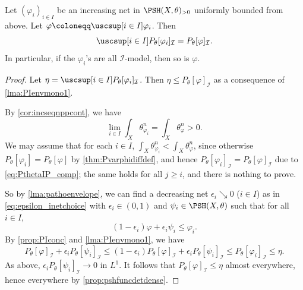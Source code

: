 \begin{proposition}\label{prop:incnetmodelPI}
    Let $(\varphi_i)_{i\in I}$ be an increasing net in $\PSH(X,\theta)_{>0}$ uniformly bounded from above. Let $\varphi\coloneqq \uscsup[i\in I]\varphi_i$. Then
    \[
        \uscsup[i\in I] P_{\theta}[\varphi_i]_{\mathcal{I}}=P_{\theta}[\varphi]_{\mathcal{I}}.
    \]
    In particular, if the $\varphi_i$'s are all $\mathcal{I}$-model, then so is $\varphi$.
\end{proposition}
\begin{proof}
    Let $\eta=\uscsup[i\in I] P_{\theta}[\varphi_i]_{\mathcal{I}}$. Then $\eta\leq P_{\theta}[\varphi]_{\mathcal{I}}$ as a consequence of \cref{lma:PIenvmono1}.

    By \cref{cor:incseqnppcont}, we have
    \[
        \lim_{i\in I} \int_X\theta_{\varphi_i}^n=\int_X\theta_{\varphi}^n>0.
    \]
    We may assume that for each $i\in I$, $\int_X\theta_{\varphi_i}^n<\int_X\theta_{\varphi}^n$, since otherwise $P_{\theta}[\varphi_i]=P_{\theta}[\varphi]$ by \cref{thm:Pvarphidiffdef}, and hence $P_{\theta}[\varphi_i]_{\mathcal{I}}=P_{\theta}[\varphi]_{\mathcal{I}}$ due to \eqref{eq:PthetaIP_comp}; the same holds for all $j\geq i$, and there is nothing to prove.

    So by \cref{lma:pathoenvelope}, we can find a decreasing net $\epsilon_i\searrow 0$ ($i\in I$) as in \eqref{eq:epsilon_inetchoice} with $\epsilon_i\in (0,1)$ and $\psi_i\in \PSH(X,\theta)$ such that for all $i\in I$,
    \[
        (1-\epsilon_i) \varphi+\epsilon_i\psi_i\leq \varphi_i.
    \]
    By \cref{prop:PIconc} and \cref{lma:PIenvmono1}, we have
    \[
        P_{\theta}[\varphi]_{\mathcal{I}}+\epsilon_i P_{\theta}[\psi_i]_{\mathcal{I}}\leq (1-\epsilon_i) P_{\theta}[\varphi]_{\mathcal{I}}+\epsilon_i P_{\theta}[\psi_i]_{\mathcal{I}}\leq P_{\theta}[\varphi_i]_{\mathcal{I}}\leq \eta.
    \]
    As above, $\epsilon_iP_{\theta}[\psi_i]_{\mathcal{I}}\to 0$ in $L^1$. It follows that $P_{\theta}[\varphi]_{\mathcal{I}}\leq \eta$ almost everywhere, hence everywhere by \cref{prop:pshfuncdetdense}.
\end{proof}


